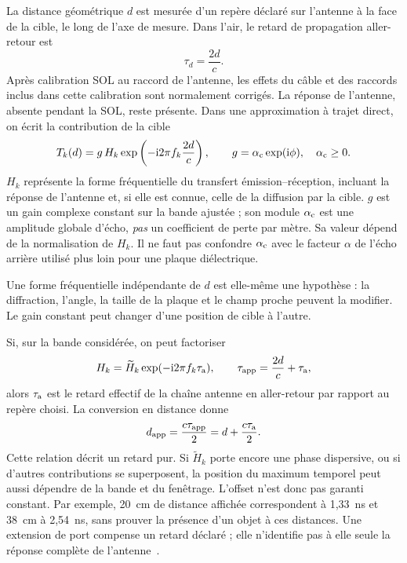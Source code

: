 \documentclass[11pt,a4paper]{article}
\newcommand{\ii}{\mathrm{i}}
\begin{document}
La distance géométrique $d$ est mesurée d'un repère déclaré sur l'antenne
à la face de la cible, le long de l'axe de mesure. Dans l'air, le retard
de propagation aller-retour est
\begin{equation}
 \tau_d=\frac{2d}{c}.
\end{equation}
Après calibration SOL au raccord de l'antenne, les effets du câble et des
raccords inclus dans cette calibration sont normalement corrigés. La réponse
de l'antenne, absente pendant la SOL, reste présente. Dans une approximation
à trajet direct, on écrit la contribution de la cible
\begin{equation}\label{eq:cible-directe}
 T_k(d)=g\,H_k\exp\left(-\ii2\pi f_k\frac{2d}{c}\right),
 \qquad g=\alpha_{\rm c}\exp(\ii\phi),\quad \alpha_{\rm c}\geq0.
\end{equation}
$H_k$ représente la forme fréquentielle du transfert émission--réception,
incluant la réponse de l'antenne et, si elle est connue, celle de la diffusion
par la cible. $g$ est un gain complexe constant sur la bande ajustée ;
son module $\alpha_{\rm c}$ est une amplitude globale d'écho, \emph{pas}
un coefficient de perte par mètre. Sa valeur dépend de la normalisation de
$H_k$. Il ne faut pas confondre $\alpha_{\rm c}$ avec le facteur $\alpha$
de l'écho arrière utilisé plus loin pour une plaque diélectrique.

Une forme fréquentielle indépendante de $d$ est elle-même une hypothèse :
la diffraction, l'angle, la taille de la plaque et le champ proche peuvent
la modifier. Le gain constant peut changer d'une position de cible à l'autre.

Si, sur la bande considérée, on peut factoriser
\begin{equation}
 H_k=\widetilde H_k\exp(-\ii2\pi f_k\tau_{\rm a}),
 \qquad \tau_{\rm app}=\frac{2d}{c}+\tau_{\rm a},
\end{equation}
alors $\tau_{\rm a}$ est le retard effectif de la chaîne antenne en
aller-retour par rapport au repère choisi. La conversion en distance donne
\begin{equation}\label{eq:cible-offset}
 d_{\rm app}=\frac{c\tau_{\rm app}}{2}
 =d+\frac{c\tau_{\rm a}}{2}.
\end{equation}
Cette relation décrit un retard pur. Si $\widetilde H_k$ porte encore une
phase dispersive, ou si d'autres contributions se superposent, la position
du maximum temporel peut aussi dépendre de la bande et du fenêtrage.
L'offset n'est donc pas garanti constant. Par exemple, 20~cm de distance
affichée correspondent à 1,33~ns et 38~cm à 2,54~ns, sans prouver la présence
d'un objet à ces distances. Une extension de port compense un retard déclaré ;
elle n'identifie pas à elle seule la réponse complète de l'antenne~\cite{portextension}.
\end{document}
